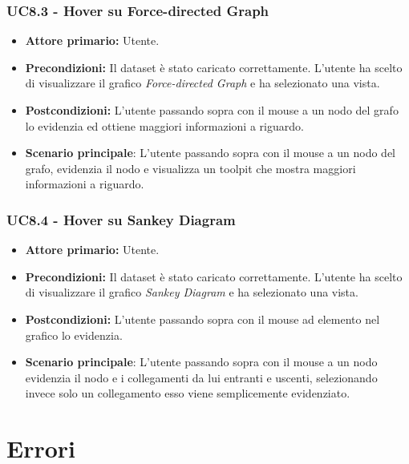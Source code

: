 \subsubsection{UC8.3 - Hover su Force-directed Graph}
\label{sec:UC8.3}
\begin{itemize}
    \item \textbf{Attore primario:} Utente.
    \item \textbf{Precondizioni:} Il dataset è stato caricato correttamente. L'utente ha scelto di visualizzare il grafico \textit{Force-directed Graph} e ha selezionato una vista.
    \item \textbf{Postcondizioni:} L'utente passando sopra con il mouse a un nodo del grafo lo evidenzia ed ottiene maggiori informazioni a riguardo.
    \item \textbf{Scenario principale}: L'utente passando sopra con il mouse a un nodo del grafo, evidenzia il nodo e visualizza un toolpit che mostra maggiori informazioni a riguardo.
\end{itemize}

\subsubsection{UC8.4 - Hover su Sankey Diagram}
\label{sec:UC8.4}
\begin{itemize}
    \item \textbf{Attore primario:} Utente.
    \item \textbf{Precondizioni:} Il dataset è stato caricato correttamente. L'utente ha scelto di visualizzare il grafico \textit{Sankey Diagram} e ha selezionato una vista.
    \item \textbf{Postcondizioni:} L'utente passando sopra con il mouse ad elemento nel grafico lo evidenzia.
    \item \textbf{Scenario principale}: L'utente passando sopra con il mouse a un nodo evidenzia il nodo e i collegamenti da lui entranti e uscenti, selezionando invece solo un collegamento esso viene semplicemente evidenziato. 
\end{itemize}

\newpage

\section{Errori}
